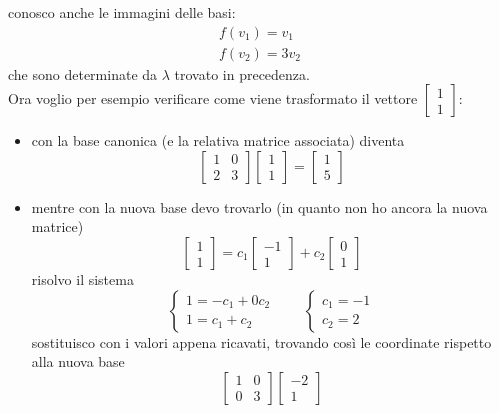\documentclass[italian]{article}
\begin{document}
conosco anche le immagini delle basi:
\begin{gather*}
	f(v_1) = v_1\\
	f(v_2) = 3v_2
\end{gather*}
che sono determinate da $\lambda$ trovato in precedenza.\\[2mm]
Ora voglio per esempio verificare come viene trasformato il vettore $\begin{bmatrix}1\\1\end{bmatrix}$:
\begin{itemize}
	\item con la base canonica (e la relativa matrice associata) diventa
		\[
			\begin{bmatrix}1 & 0\\2 & 3\end{bmatrix}
			\begin{bmatrix}1\\1\end{bmatrix}
			=
			\begin{bmatrix}1\\5\end{bmatrix}
		\]
	\item mentre con la nuova base devo trovarlo (in quanto non ho ancora la nuova matrice)
		\[
			\begin{bmatrix}1\\1\end{bmatrix}
			=
			c_1\begin{bmatrix}-1\\1\end{bmatrix}
			+
			c_2\begin{bmatrix}0\\1\end{bmatrix}
		\]
		risolvo il sistema
		\[
			\begin{cases*}
				1 = -c_1 + 0c_2 \\
				1 = c_1 + c_2
			\end{cases*}
			\qquad
			\begin{cases*}
				c_1 = -1 \\
				c_2 = 2
			\end{cases*}
		\]
		sostituisco con i valori appena ricavati, trovando così le coordinate rispetto alla nuova base
		\[
			\begin{bmatrix}1 & 0 \\ 0 & 3\end{bmatrix}
			\begin{bmatrix}-2\\1\end{bmatrix}
\]
\end{itemize}
\end{document}
